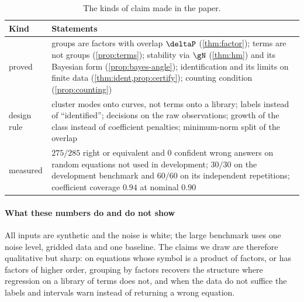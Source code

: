 \begin{table}[b]
\centering\small
\caption{The kinds of claim made in the paper.}\label{tab:status}
\begin{tabularx}{\linewidth}{@{}>{\raggedright\arraybackslash}p{2.0cm}X@{}}
\toprule
Kind & Statements\\
\midrule
proved & groups are factors with overlap $\deltaP$ (\cref{thm:factor}); terms are not groups (\cref{prop:terms});
stability via $\gN$ (\cref{thm:hm}) and its Bayesian form (\cref{prop:bayes-angle}); identification and its limits on
finite data (\cref{thm:ident,prop:certify}); counting condition (\cref{prop:counting})\\
design rule & cluster modes onto curves, not terms onto a library; labels instead of ``identified''; decisions on the raw
observations; growth of the class instead of coefficient penalties; minimum-norm split of the overlap\\
measured & $275/285$ right or equivalent and $0$ confident wrong answers on random equations not used in development;
$30/30$ on the development benchmark and $60/60$ on its independent repetitions; coefficient coverage $0.94$ at nominal
$0.90$\\
\bottomrule
\end{tabularx}
\end{table}

\paragraph{What these numbers do and do not show} All inputs are synthetic and the noise is white; the large benchmark
uses one noise level, gridded data and one baseline. The claims we draw are therefore qualitative but sharp: on
equations whose symbol is a product of factors, or has factors of higher order, grouping by factors recovers the
structure where regression on a library of terms does not, and when the data do not suffice the labels and intervals
warn instead of returning a wrong equation.

